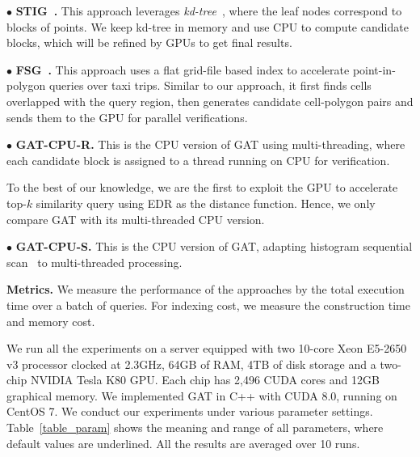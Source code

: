 \documentclass[10pt,conference,letterpaper]{IEEEtran}
\newcommand{\frname}{GAT\xspace }
\begin{document}
\vspace{0.1cm}$\bullet$ \textbf{STIG~\cite{7498315}.} This approach leverages \emph{kd-tree}~\cite{DBLP:journals/cacm/Bentley75}, where the leaf nodes correspond to blocks of points.
We keep kd-tree in memory and use CPU to compute candidate blocks, which will be refined by GPUs to get final results.

\vspace{0.1cm}$\bullet$ \textbf{FSG~\cite{GPUTaxi}.} This approach uses a flat grid-file based index to accelerate point-in-polygon queries over taxi trips. Similar to our approach, it first finds cells overlapped with the query region, then generates candidate cell-polygon pairs and sends them to the GPU for parallel verifications.

\vspace{0.1cm}$\bullet$ \textbf{\frname-CPU-R.} This is the CPU version of \frname using multi-threading, where each candidate block is assigned to a thread running on CPU for verification.

To the best of our knowledge, we are the first to exploit the GPU to accelerate top-$k$ similarity query using EDR as the distance function. Hence, we only compare \frname with its multi-threaded CPU version.

\vspace{0.1cm}$\bullet$ \textbf{\frname-CPU-S.} This is the CPU version of \frname, adapting histogram sequential scan~\cite{DBLP:conf/sigmod/ChenOO05} to multi-threaded processing.

\vspace{0.1cm}\textbf{Metrics.}
We measure the performance of the approaches by the total execution time over a batch of queries. For indexing cost, we measure the construction time and memory cost.

We run all the experiments on a server equipped with two 10-core Xeon E5-2650 v3 processor clocked at 2.3GHz, 64GB of RAM, 4TB of disk storage and a two-chip NVIDIA Tesla K80 GPU. Each chip has 2,496 CUDA cores and 12GB graphical memory. We implemented \frname in C++ with CUDA 8.0, running on CentOS 7. We conduct our experiments under various parameter settings. Table~\ref{table_param} shows the meaning and range of all parameters, where default values are underlined. All the results are averaged over 10 runs.
\end{document}
